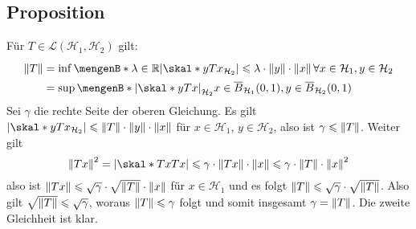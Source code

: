 \subsection[Proposition: Darstellung der Operatornorm durch $\inf$ und $\sup$ für Hilberträume]{Proposition} %
\label{sub:726}
Für $T \in \mathcal{L}(\mathcal{H}_1, \mathcal{H}_2)$ gilt: 
\begin{align*}
	\norm{T} &= \inf \set[\lambda \in \mathds{R}]{ \abs*{\skal*{y}{T x}_{\mathcal{H}_2}} \le \lambda \cdot \norm{y} \cdot \norm{x} \,\forall x \in \mathcal{H}_1, y \in 
	\mathcal{H}_2\rule{0cm}{1em}}  \\
	&= \sup \set[\abs*{\skal*{y}{T x}}_{\mathcal{H}_2}]{ x \in \overline{B}_{\mathcal{H}_1}(0,1), y \in \overline{B}_{\mathcal{H}_2}(0,1) \rule{0cm}{1em}} 
\end{align*}
Sei $\gamma$ die rechte Seite der oberen Gleichung.
Es gilt $\abs*{\skal*{y}{Tx}_{\mathcal{H}_2}} \le \norm{T} \cdot \norm{y} \cdot \norm{x}$ für $x \in \mathcal{H}_1$, $y \in \mathcal{H}_2$, also ist 
$\gamma \le \norm{T}$. Weiter gilt 
\[
	\norm{T x}^2 = \abs*{\skal*{T x}{T x}} \le \gamma \cdot \norm{T x} \cdot \norm{x} \le \gamma \cdot \norm{T} \cdot \norm{x}^2
\]
also ist $\norm{T x} \le \sqrt{\gamma} \cdot \sqrt{\norm{T}} \cdot \norm{x}$ für $x \in \mathcal{H}_1$ und es folgt $\norm{T} \le \sqrt{\gamma} \cdot \sqrt{\norm{T}}$. Also
gilt $\sqrt{\norm{T}} \le \sqrt{\gamma}$, woraus $\norm{T} \le \gamma$ folgt und somit insgesamt $\gamma = \norm{T}$.
Die zweite Gleichheit ist klar. \bewende

